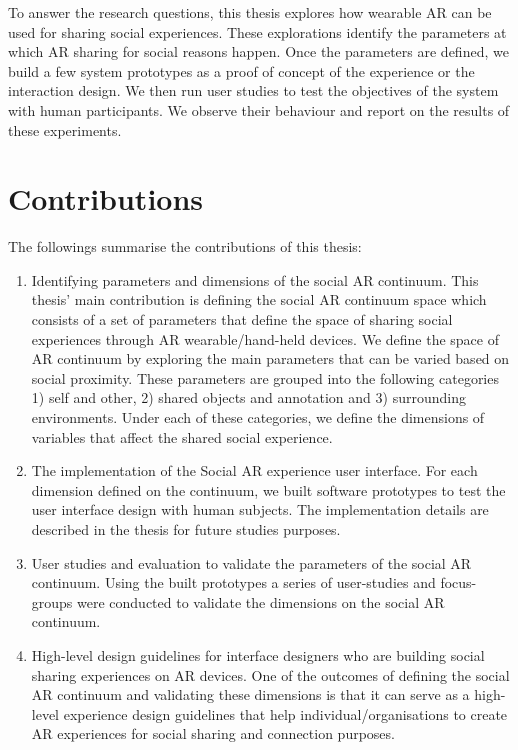 To answer the research questions, this thesis explores how wearable AR can be used for sharing social experiences. These explorations identify the parameters at which AR sharing for social reasons happen. Once the parameters are defined, we build a few system prototypes as a proof of concept of the experience or the interaction design. We then run user studies to test the objectives of the system with human participants. We observe their behaviour and report on the results of these experiments. 

\section{Contributions}

The followings summarise the contributions of this thesis: 

\begin{enumerate}
    \item Identifying parameters and dimensions of the social AR continuum. This thesis' main contribution is defining the social AR continuum space which consists of a set of parameters that define the space of sharing social experiences through AR wearable/hand-held devices. We define the space of AR continuum by exploring the main parameters that can be varied based on social proximity. These parameters are grouped into the following categories 1) self and other, 2) shared objects and annotation and 3) surrounding environments. Under each of these categories, we define the dimensions of variables that affect the shared social experience.
    
    \item The implementation of the Social AR experience user interface. For each dimension defined on the continuum, we built software prototypes to test the user interface design with human subjects. The implementation details are described in the thesis for future studies purposes.
    
    \item User studies and evaluation to validate the parameters of the social AR continuum.  Using the built prototypes a series of user-studies and focus-groups were conducted to validate the dimensions on the social AR continuum. 
    
    \item High-level design guidelines for interface designers who are building social sharing experiences on AR devices. One of the outcomes of defining the social AR continuum and validating these dimensions is that it can serve as a high-level experience design guidelines that help individual/organisations to create AR experiences for social sharing and connection purposes.
\end{enumerate}

